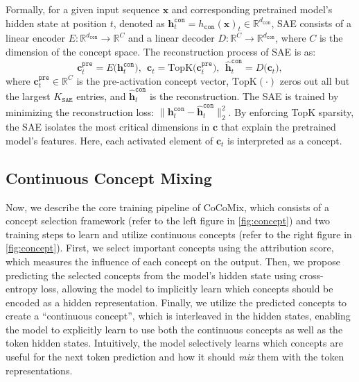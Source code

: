 \documentclass[]{fairmeta}
\def\rvc{{\mathbf{c}}}
\def\rvh{{\mathbf{h}}}
\def\rvx{{\mathbf{x}}}
\newcommand{\mmname}{Continuous Concept Mixing\xspace}
\newcommand{\sname}{CoCoMix\xspace}
\begin{document}
Formally, for a given input sequence $\rvx$ and corresponding pretrained model's hidden state at position $t$, denoted as $\rvh_t^{\mathtt{con}}=h_\mathtt{con}(\rvx)_t \in \mathbb{R}^{d_\mathtt{con}}$, SAE consists of a linear encoder $E: \mathbb{R}^{d_{\mathtt{con}}} \to \mathbb{R}^{C}$ and a linear decoder $D:\mathbb{R}^{C} \to \mathbb{R}^{d_\mathtt{con}}$, where $C$ is the dimension of the concept space. The reconstruction process of SAE is as:
\begin{equation*}
    \rvc_t^{\mathtt{pre}} = E\bigl(\rvh_t^\mathtt{con}\bigr), 
    ~~
    \rvc_t = \mathrm{TopK}\bigl(\rvc_t^{\mathtt{pre}}\bigr),
    ~~
    \widehat{\rvh}_t^\mathtt{con} = D\bigl(\rvc_t\bigr),
\end{equation*}
where $\rvc_t^{\mathtt{pre}}\in\mathbb{R}^{C}$ is the pre-activation concept vector, $\mathrm{TopK}(\cdot)$ zeros out all but the largest \(K_{\mathtt{SAE}}\) entries, and $\widehat{\rvh}_t^\mathtt{con}$ is the reconstruction. The SAE is trained by minimizing the reconstruction loss: $\lVert \rvh_t^\mathtt{con} - \widehat{\rvh}_t^\mathtt{con}\rVert_{2}^2$. By enforcing TopK sparsity, the SAE isolates the most critical dimensions in $\rvc$ that explain the pretrained model’s features. Here, each activated element of $\rvc_t$ is interpreted as a concept.


\subsection{\mmname}
\label{sec:method_cocomix}

Now, we describe the core training pipeline of \sname, which consists of a concept selection framework (refer to the left figure in \autoref{fig:concept}) and two training steps to learn and utilize continuous concepts (refer to the right figure in \autoref{fig:concept}). First, we select important concepts using the attribution score, which measures the influence of each concept on the output. Then, we propose predicting the selected concepts from the model's hidden state using cross-entropy loss, allowing the model to implicitly learn which concepts should be encoded as a hidden representation. Finally, we utilize the predicted concepts to create a ``continuous concept'', which is interleaved in the hidden states, enabling the model to explicitly learn to use both the continuous concepts as well as the token hidden states. Intuitively, the model selectively learns which concepts are useful for the next token prediction and how it should \emph{mix} them with the token representations.
\end{document}
